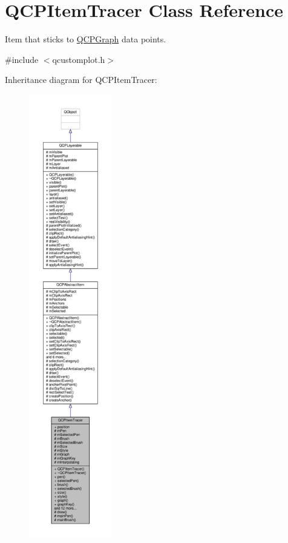 \hypertarget{class_q_c_p_item_tracer}{}\section{Q\+C\+P\+Item\+Tracer Class Reference}
\label{class_q_c_p_item_tracer}


Item that sticks to \hyperlink{class_q_c_p_graph}{Q\+C\+P\+Graph} data points.  




{\ttfamily \#include $<$qcustomplot.\+h$>$}



Inheritance diagram for Q\+C\+P\+Item\+Tracer\+:\nopagebreak
\begin{figure}[H]
\begin{center}
\leavevmode
\includegraphics[height=550pt]{class_q_c_p_item_tracer__inherit__graph}
\end{center}
\end{figure}


